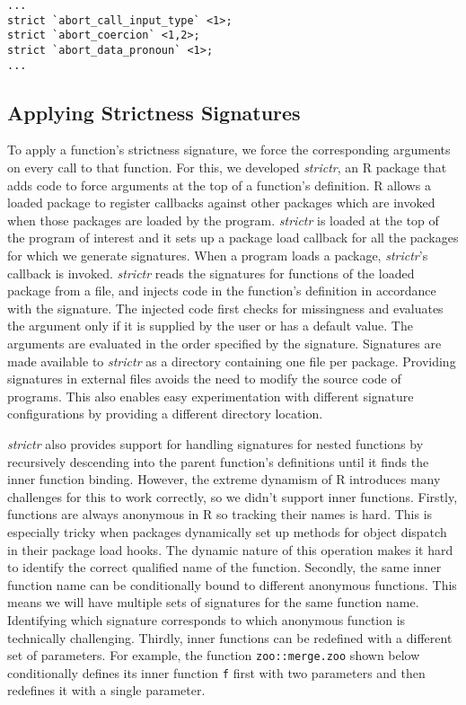 \documentclass[review,nonacm,screen,acmsmall,anonymous=true]{acmart}
\newcommand{\code}[1]{\lstinline[style=R]|#1|\xspace}
\begin{document}
\begin{verbatim}
...
strict `abort_call_input_type` <1>;
strict `abort_coercion` <1,2>;
strict `abort_data_pronoun` <1>;
...
\end{verbatim}

\subsection{Applying Strictness Signatures}

To apply a function's strictness signature, we force the corresponding arguments
on every call to that function. For this, we developed \emph{strictr}, an R
package that adds code to force arguments at the top of a function's definition.
R allows a loaded package to register callbacks against other packages which are
invoked when those packages are loaded by the program. \emph{strictr} is loaded
at the top of the program of interest and it sets up a package load callback for
all the packages for which we generate signatures. When a program loads a
package, \emph{strictr}'s callback is invoked. \emph{strictr} reads the
signatures for functions of the loaded package from a file, and injects code in
the function's definition in accordance with the signature. The injected code
first checks for missingness and evaluates the argument only if it is supplied
by the user or has a default value. The arguments are evaluated in the order
specified by the signature. Signatures are made available to \emph{strictr} as a
directory containing one file per package. Providing signatures in external
files avoids the need to modify the source code of programs. This also enables
easy experimentation with different signature configurations by providing a
different directory location.

\emph{strictr} also provides support for handling signatures for nested
functions by recursively descending into the parent function's definitions until
it finds the inner function binding. However, the extreme dynamism of R
introduces many challenges for this to work correctly, so we didn't support
inner functions. Firstly, functions are always anonymous in R so tracking their
names is hard. This is especially tricky when packages dynamically set up
methods for object dispatch in their package load hooks. The dynamic nature of
this operation makes it hard to identify the correct qualified name of the
function. Secondly, the same inner function name can be conditionally bound to
different anonymous functions. This means we will have multiple sets of
signatures for the same function name. Identifying which signature corresponds
to which anonymous function is technically challenging. Thirdly, inner functions
can be redefined with a different set of parameters. For example, the function
\code{zoo::merge.zoo} shown below conditionally defines its inner function
\code{f} first with two parameters and then redefines it with a single
parameter.
\end{document}
